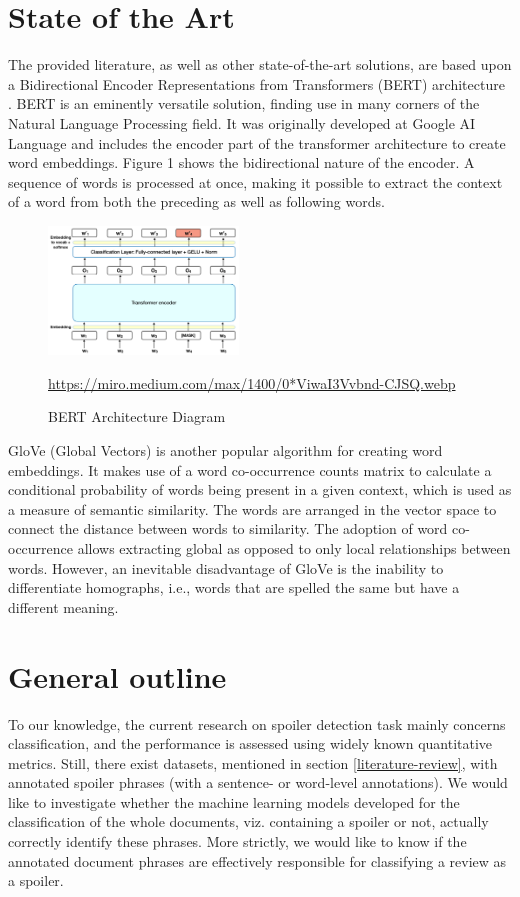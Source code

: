 \documentclass[11pt]{article}
\begin{document}
\section{State of the Art}
The provided literature, as well as other state-of-the-art solutions, are based upon a Bidirectional Encoder Representations from Transformers (BERT) architecture \cite{devlin2018bert}. BERT is an eminently versatile solution, finding use in many corners of the Natural Language Processing field. It was originally developed at Google AI Language and includes the encoder part of the transformer architecture to create word embeddings. Figure 1 shows the bidirectional nature of the encoder. A sequence of words is processed at once, making it possible to extract the context of a word from both the preceding as well as following words.
\begin{figure}[h]
\begin{center}
\includegraphics[width=0.45\textwidth]{Bert.png}
\caption[]{BERT Architecture Diagram}
\url{https://miro.medium.com/max/1400/0*ViwaI3Vvbnd-CJSQ.webp}
\label{bert_arch}
\end{center}
\end{figure}


GloVe (Global Vectors) \cite{pennington2014glove} is another popular algorithm for creating word embeddings. It makes use of a word co-occurrence counts matrix to calculate a conditional probability of words being present in a given context, which is used as a measure of semantic similarity. The words are arranged in the vector space to connect the distance between words to similarity. The adoption of word co-occurrence allows extracting global as opposed to only local relationships between words. However, an inevitable disadvantage of GloVe is the inability to differentiate homographs, i.e., words that are spelled the same but have a different meaning.


\section{General outline}
To our knowledge, the current research on spoiler detection task mainly concerns classification, and the performance is assessed using widely known quantitative metrics. Still, there exist datasets, mentioned in section \ref{literature-review}, with annotated spoiler phrases (with a sentence- or word-level annotations). We would like to investigate whether the machine learning models developed for the classification of the whole documents, viz. containing a spoiler or not, actually correctly identify these phrases. More strictly, we would like to know if the annotated document phrases are effectively responsible for classifying a review as a spoiler.
\end{document}
